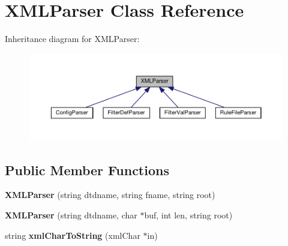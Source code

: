 \hypertarget{classXMLParser}{}\section{X\+M\+L\+Parser Class Reference}
\label{classXMLParser}


Inheritance diagram for X\+M\+L\+Parser\+:
\nopagebreak
\begin{figure}[H]
\begin{center}
\leavevmode
\includegraphics[width=350pt]{classXMLParser__inherit__graph}
\end{center}
\end{figure}
\subsection*{Public Member Functions}
\begin{DoxyCompactItemize}
\item 
\mbox{\label{classXMLParser_a952a2ca2ec7be3b75216e4dcb6d86d79}} 
{\bfseries X\+M\+L\+Parser} (string dtdname, string fname, string root)
\item 
\mbox{\label{classXMLParser_a33bc53a372dd5d83dde2ad663b81d5b2}} 
{\bfseries X\+M\+L\+Parser} (string dtdname, char $\ast$buf, int len, string root)
\item 
\mbox{\label{classXMLParser_a36c97284d2dbc339c71a511139858994}} 
string {\bfseries xml\+Char\+To\+String} (xml\+Char $\ast$in)
\end{DoxyCompactItemize}
